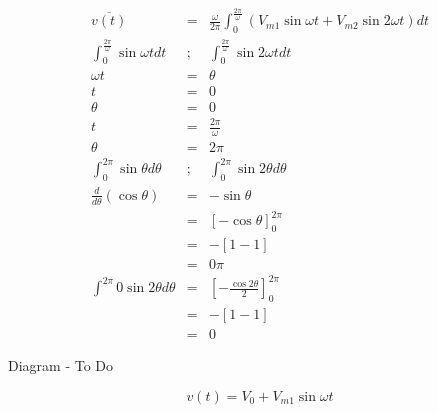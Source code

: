 \documentclass[a4paper,12pt]{article}
\begin{document}
\begin{eqnarray*}
\overline{v(t)} & = & \frac{\omega}{2 \pi} \int^{\frac{2 \pi}{\omega}}_{0} \left( V_{m1} \sin{\omega t} + V_{m2} \sin{2 \omega t} \right) dt \\
\int^{\frac{2 \pi}{\omega}}_{0} \sin{\omega t}dt & ; & \int^{\frac{2 \pi}{\omega}}_{0} \sin{2 \omega t}dt \\
\omega t 		 & = & \theta \\
t					 & = & 0 \\
\theta			 & = & 0 \\
t					 & = & \frac{2 \pi}{\omega} \\
\theta 			 & = & 2 \pi \\
\int^{2 \pi}_{0} \sin{\theta}d\theta & ; & \int^{2 \pi}_{0} \sin{2 \theta}d\theta \\
\frac{d}{d\theta} \left(\cos{\theta} \right) & = & - \sin{\theta} \\
															& = & \left[ - \cos{\theta}
															\right]^{2 \pi}_{0} \\
															& = & - [1 - 1] \\
															& = & 0 \pi \\
\int^{2 \pi}{0} \sin{2 \theta}d\theta			& = & \left[ - \frac{\cos{2 \theta}}{2} \right]^{2 \pi}_{0} \\
															& = & - [1 - 1] \\
															& = & 0 
\end{eqnarray*}

\begin{table}[hbtp]

Diagram - To Do

\end{table}

\[ v(t) = V_{0} + V_{m1} \sin{\omega t} \]

\subsection{}
\end{document}
